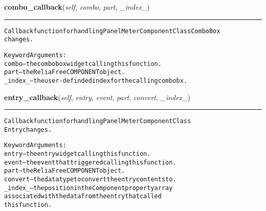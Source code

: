     \vspace{0.5ex}

\hspace{.8\funcindent}\begin{boxedminipage}{\funcwidth}

    \raggedright \textbf{combo\_callback}(\textit{self}, \textit{combo}, \textit{part}, \textit{\_index\_})

    \vspace{-1.5ex}

    \rule{\textwidth}{0.5\fboxrule}
\setlength{\parskip}{2ex}
\begin{alltt}
Callback function for handling Panel Meter Component Class ComboBox
changes.

Keyword Arguments:
  combo -- the combobox widget calling this function.
   part -- the ReliaFree COMPONENT object.
\_index\_ -- the user-definded index for the calling combobx.
\end{alltt}

\setlength{\parskip}{1ex}
    \end{boxedminipage}

    \label{reliafree:meters:meter:Panel:entry_callback}

    \vspace{0.5ex}

\hspace{.8\funcindent}\begin{boxedminipage}{\funcwidth}

    \raggedright \textbf{entry\_callback}(\textit{self}, \textit{entry}, \textit{event}, \textit{part}, \textit{convert}, \textit{\_index\_})

    \vspace{-1.5ex}

    \rule{\textwidth}{0.5\fboxrule}
\setlength{\parskip}{2ex}
\begin{alltt}
Callback function for handling Panel Meter Component Class
Entry changes.

Keyword Arguments:
  entry -- the entry widget calling this function.
  event -- the event that triggered calling this function.
   part -- the ReliaFree COMPONENT object.
convert -- the data type to convert the entry contents to.
\_index\_ -- the position in the Component property array
           associated with the data from the entry that called
           this function.
\end{alltt}

\setlength{\parskip}{1ex}
    \end{boxedminipage}

